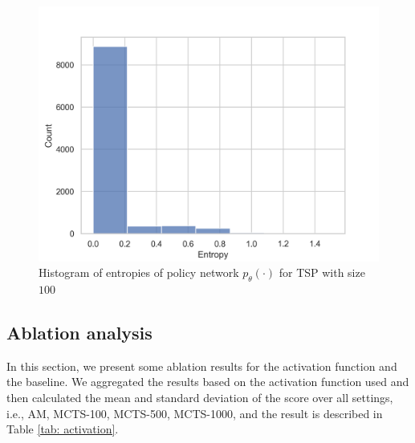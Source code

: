 \documentclass{article}
\begin{document}
\begin{figure}
    \centering
    \includegraphics[width=0.5\linewidth]{figures/entropy.png}
    \caption{Histogram of entropies of policy network $p_\theta(\cdot)$ for TSP with size $100$}
    \label{fig:entropy_hist}
\end{figure}

\subsection{Ablation analysis}

In this section, we present some ablation results for the activation function and the baseline. We aggregated the results based on the activation function used and then calculated the mean and standard deviation of the score over all settings, i.e., AM, MCTS-100, MCTS-500, MCTS-1000, and the result is described in Table \ref{tab: activation}.

\begin{table}[htbp]
  \centering
  \caption{Performance results according to activation functions}
  \label{tab: activation}%
\end{table}%
\end{document}
